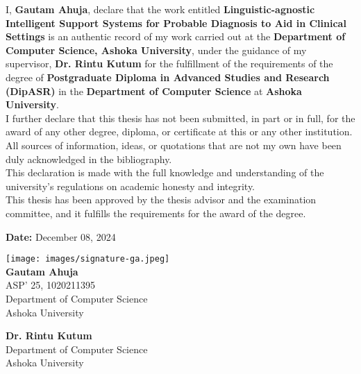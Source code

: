 I, \textbf{Gautam Ahuja}, declare that the work entitled \textbf{Linguistic-agnostic Intelligent Support Systems for Probable Diagnosis to Aid in Clinical Settings} is an authentic record of my work carried out at the \textbf{Department of Computer Science, Ashoka University}, under the guidance of my supervisor, \textbf{Dr. Rintu Kutum} for the fulfillment of the requirements of the degree of \textbf{Postgraduate Diploma in Advanced Studies and Research (DipASR)} in the \textbf{Department of Computer Science} at \textbf{Ashoka University}. \\%

\noindent I further declare that this thesis has not been submitted, in part or in full, for the award of any other degree, diploma, or certificate at this or any other institution. All sources of information, ideas, or quotations that are not my own have been duly acknowledged in the bibliography. \\ %


\noindent This declaration is made with the full knowledge and understanding of the university's regulations on academic honesty and integrity. \\%


\noindent This thesis has been approved by the thesis advisor and the examination committee, and it fulfills the requirements for the award of the degree.\\%

\begin{flushleft}
\textbf{Date:} December 08, 2024
\end{flushleft}

\begin{flushright}
\texttt{[image: images/signature-ga.jpeg]}\\
\textbf{Gautam Ahuja}\\
ASP' 25, 1020211395\\
Department of Computer Science\\
Ashoka University\\
\end{flushright}

\vspace{1cm}
\begin{flushright}
\textbf{Dr. Rintu Kutum}\\
Department of Computer Science\\
Ashoka University\\
\end{flushright}